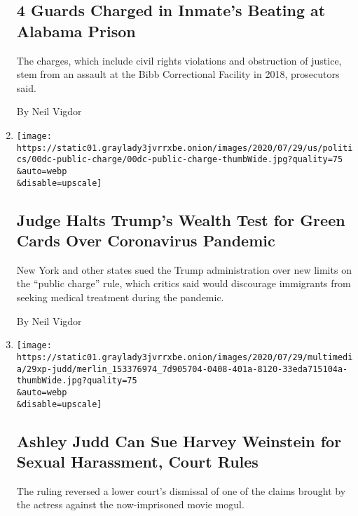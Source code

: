 \begin{enumerate}
{  \subsection{4 Guards Charged in Inmate's Beating at Alabama
  Prison}\label{4-guards-charged-in-inmates-beating-at-alabama-prison}}

  The charges, which include civil rights violations and obstruction of
  justice, stem from an assault at the Bibb Correctional Facility in
  2018, prosecutors said.

  By Neil Vigdor
\item
  \href{/2020/07/30/us/trump-green-card.html}{}

  \texttt{[image: https://static01.graylady3jvrrxbe.onion/images/2020/07/29/us/politics/00dc-public-charge/00dc-public-charge-thumbWide.jpg?quality=75\\\&auto=webp\\\&disable=upscale]}

  \hypertarget{judge-halts-trumps-wealth-test-for-green-cards-over-coronavirus-pandemic}{%
  \subsection{Judge Halts Trump's Wealth Test for Green Cards Over
  Coronavirus
  Pandemic}\label{judge-halts-trumps-wealth-test-for-green-cards-over-coronavirus-pandemic}}

  New York and other states sued the Trump administration over new
  limits on the ``public charge'' rule, which critics said would
  discourage immigrants from seeking medical treatment during the
  pandemic.

  By Neil Vigdor
\item
  \href{/2020/07/29/business/media/judd-weinstein-lawsuit-appeal.html}{}

  \texttt{[image: https://static01.graylady3jvrrxbe.onion/images/2020/07/29/multimedia/29xp-judd/merlin\_153376974\_7d905704-0408-401a-8120-33eda715104a-thumbWide.jpg?quality=75\\\&auto=webp\\\&disable=upscale]}

  \hypertarget{ashley-judd-can-sue-harvey-weinstein-for-sexual-harassment-court-rules}{%
  \subsection{Ashley Judd Can Sue Harvey Weinstein for Sexual
  Harassment, Court
  Rules}\label{ashley-judd-can-sue-harvey-weinstein-for-sexual-harassment-court-rules}}

  The ruling reversed a lower court's dismissal of one of the claims
  brought by the actress against the now-imprisoned movie mogul.


\end{enumerate}
